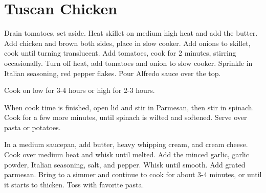 \section{Tuscan Chicken}
\begin{recipe}
	



Drain tomatoes, set aside. Heat skillet on medium high heat and add the butter. Add chicken and brown both sides, place in slow cooker. Add onions to skillet, cook until turning translucent. Add tomatoes, cook for 2 minutes, stirring occasionally. Turn off heat, add tomatoes and onion to slow cooker. Sprinkle in Italian seasoning, red pepper flakes. Pour Alfredo sauce over the top.

Cook on low for 3-4 hours or high for 2-3 hours.

When cook time is finished, open lid and stir in Parmesan, then stir in spinach. Cook for a few more minutes, until spinach is wilted and softened. Serve over pasta or potatoes.


In a medium saucepan, add butter, heavy whipping cream, and cream cheese. Cook over medium heat and whisk until melted. Add the minced garlic, garlic powder, Italian seasoning, salt, and pepper. Whisk until smooth. Add grated parmesan. Bring to a simmer and continue to cook for about 3-4 minutes, or until it starts to thicken. Toss with favorite pasta.
	
\end{recipe}
